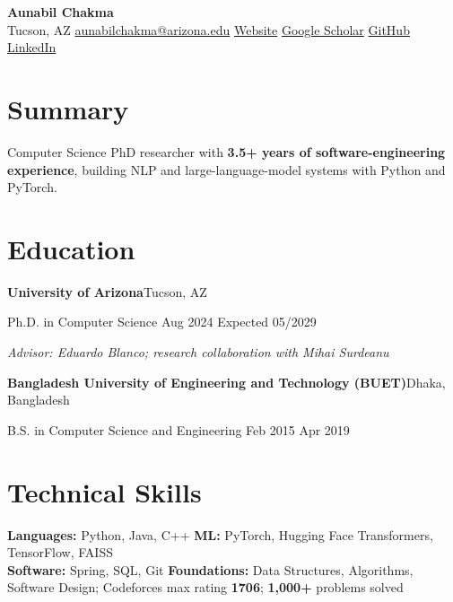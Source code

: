 \documentclass[11pt]{extarticle}
\newcommand{\entryheading}[2]{%
  {\normalsize #1}\hfill{\small #2}\par
}
\newcommand{\entrydetail}[1]{{\small #1}\par}
\begin{document}
\begin{center}
  {\LARGE\textbf{Aunabil Chakma}}\\[-1pt]
  Tucson, AZ \;\textbullet\;
  \href{mailto:aunabilchakma@arizona.edu}{aunabilchakma@arizona.edu} \;\textbullet\;
  \href{https://aunabil4602.github.io/}{Website} \;\textbullet\;
  \href{https://scholar.google.com/citations?hl=en&user=LQepJpUAAAAJ&view_op=list_works&sortby=pubdate}{Google Scholar} \;\textbullet\;
  \href{https://github.com/Aunabil4602}{GitHub} \;\textbullet\;
  \href{https://www.linkedin.com/in/aunabil-chakma-56052119b/}{LinkedIn}
\end{center}

\vspace{-0.55em}
\section*{Summary}
{\small Computer Science PhD researcher with \textbf{3.5+ years of software-engineering experience}, building NLP and large-language-model systems with Python and PyTorch.}

\section*{Education}
\entryheading{\textbf{University of Arizona}}{Tucson, AZ}
\entrydetail{Ph.D. in Computer Science \hfill Aug 2024 \textendash{} Expected 05/2029}
\entrydetail{\textit{Advisor: Eduardo Blanco; research collaboration with Mihai Surdeanu}}

\vspace{3pt}
\entryheading{\textbf{Bangladesh University of Engineering and Technology (BUET)}}{Dhaka, Bangladesh}
\entrydetail{B.S. in Computer Science and Engineering \hfill Feb 2015 \textendash{} Apr 2019}

\section*{Technical Skills}
{\small
\textbf{Languages:} Python, Java, C++ \quad
\textbf{ML:} PyTorch, Hugging Face Transformers, TensorFlow, FAISS\\[-1pt]
\textbf{Software:} Spring, SQL, Git \quad
\textbf{Foundations:} Data Structures, Algorithms, Software Design; Codeforces max rating \textbf{1706}; \textbf{1,000+} problems solved
}
\end{document}
